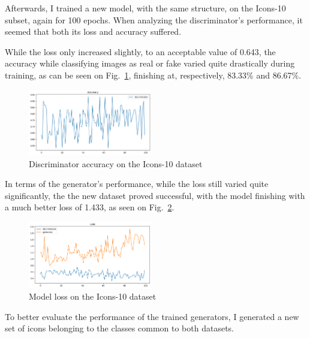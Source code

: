 \documentclass[conference]{IEEEtran}
\begin{document}
Afterwards, I trained a new model, with the same structure, on the Icons-10 subset, again for 100 epochs. When analyzing the discriminator's performance, it seemed that both its loss and accuracy suffered. 

While the loss only increased slightly, to an acceptable value of 0.643, the accuracy while classifying images as real or fake varied quite drastically during training, as can be seen on Fig.~\ref{fig:Icons10Acc}, finishing at, respectively, 83.33\% and 86.67\%.

\begin{figure}[htbp]
    \centering
    \includegraphics[width=0.48\textwidth]{paper/images/icons10/icons10_acc.png}
    \caption{Discriminator accuracy on the Icons-10 dataset}
    \label{fig:Icons10Acc}
\end{figure}

In terms of the generator's performance, while the loss still varied quite significantly, the the new dataset proved successful, with the model finishing with a much better loss of 1.433, as seen on Fig.~\ref{fig:Icons10Loss}.

\begin{figure}[htbp]
    \centering
    \includegraphics[width=0.48\textwidth]{paper/images/icons10/icons10_loss.png}
    \caption{Model loss on the Icons-10 dataset}
    \label{fig:Icons10Loss}
\end{figure}

To better evaluate the performance of the trained generators, I generated a new set of icons belonging to the classes common to both datasets.
\end{document}
